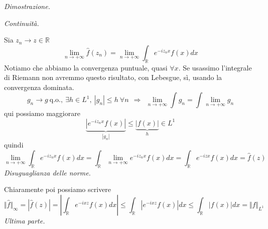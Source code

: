 \textit{Dimostrazione.}

\textit{Continuità.}

Sia $z_{n}\rightarrow z\in \mathbb{R}$
\begin{equation*}
\lim\limits _{n\rightarrow +\infty }\hat{f}( z_{n}) =\lim\limits _{n\rightarrow +\infty }\int _{\mathbb{R}} e^{-iz_{n} x} f( x) dx
\end{equation*}
Notiamo che abbiamo la convergenza puntuale, quasi $\forall x$. Se usassimo l'integrale di Riemann non avremmo questo risultato, con Lebesgue, sì, usando la convergenza dominata.
\begin{equation*}
g_{n}\rightarrow g\ \text{q.o.} ,\ \exists h\in L^{1} ,\ | g_{n}| \leqslant h\ \forall n\ \ \Rightarrow \ \ \lim\limits _{n\rightarrow +\infty }\int g_{n} =\int \lim\limits _{n\rightarrow +\infty } g_{n}
\end{equation*}
qui possiamo maggiorare
\begin{equation*}
\underbrace{\left| e^{-iz_{n} x} f( x)\right| }_{| g_{n}| } \leqslant \underbrace{| f( x)| }_{h} \in L^{1}
\end{equation*}
quindi
\begin{equation*}
\lim\limits _{n\rightarrow +\infty }\int _{\mathbb{R}} e^{-iz_{n} x} f( x) dx=\int _{\mathbb{R}}\lim\limits _{n\rightarrow +\infty } e^{-iz_{n} x} f( x) dx=\int _{\mathbb{R}} e^{-izx} f( x) dx=\hat{f}( z)
\end{equation*}
\textit{Disuguaglianza delle norme.}

Chiaramente poi possiamo scrivere
\begin{equation*}
\Vert \hat{f}\Vert _{\infty } =| \hat{f}( z)| =\left| \int _{\mathbb{R}} e^{-ixz} f( x) dx\right| \leqslant \int _{\mathbb{R}}\left| e^{-ixz} f( x)\right| dx\leqslant \int _{\mathbb{R}}| f( x)| dx=\Vert f\Vert _{L^{1}}
\end{equation*}
\textit{Ultima parte.}

